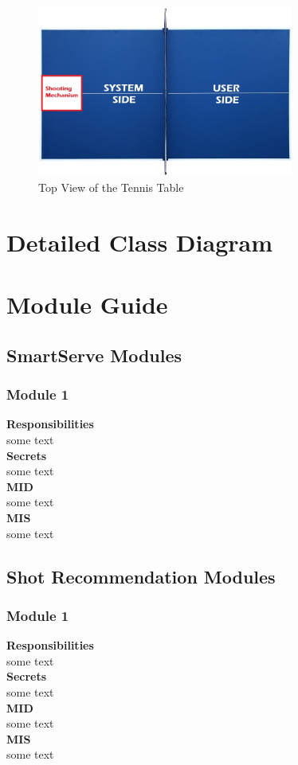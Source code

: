 \documentclass[11pt]{article}
\begin{document}
\begin{figure}[H]
   \centering
   \includegraphics[width=0.75\textwidth]{../img/Table-Tennis-Top-View.png} %
   \caption{Top View of the Tennis Table}
   \label{fig:table-tennis-top-view}
\end{figure}

\section{Detailed Class Diagram}

\section{Module Guide}
\subsection{SmartServe Modules}
\subsubsection*{Module 1}
\textbf{Responsibilities} \\
some text \\
\textbf{Secrets} \\ 
some text \\ 
\textbf{MID} \\
some text \\
\textbf{MIS} \\
some text \\
\subsection{Shot Recommendation Modules}
\subsubsection*{Module 1}
\textbf{Responsibilities} \\
some text \\
\textbf{Secrets} \\ 
some text \\ 
\textbf{MID} \\
some text \\
\textbf{MIS} \\
some text \\
\end{document}
